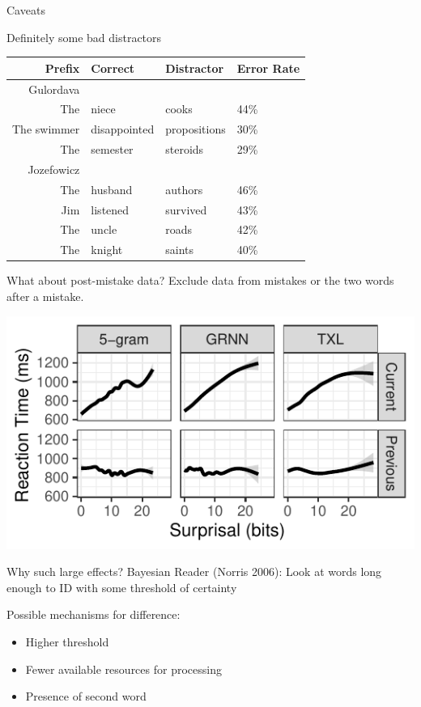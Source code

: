 \documentclass[ 12pt, xcolor=beamer,table,usenames,dvipsnames, ignorenonframetext, ngerman]{beamer}
\begin{document}
\begin{frame}{Caveats}
	
	{\large Definitely some bad distractors}
	\begin{table}
		
		
		\begin{tabular}{rlll}
			Prefix & Correct & Distractor & Error Rate \\
			\hline
			\hline
			Gulordava&&&\\
			\hline
			The & niece & cooks & 44\%\\
			The swimmer & disappointed & propositions & 30\%\\
			The & semester & steroids & 29\%\\
			\hline
			\hline
			Jozefowicz&&&\\
			\hline
			The & husband & authors & 46\%\\
			Jim & listened & survived & 43\%\\
			The & uncle & roads & 42\%\\
			The & knight & saints & 40\%\\
		\end{tabular}
	\end{table}
	
\end{frame}


\begin{frame}{What about post-mistake data?}
	Exclude data from mistakes or the two words after a mistake. 
	
	\includegraphics[width=.9\textwidth]{../Images/gam2.pdf}	
\end{frame}

\begin{frame}{Why such large effects?}
	Bayesian Reader (Norris 2006): Look at words long enough to ID with some threshold of certainty 
	
	
	Possible mechanisms for difference: 
	\begin{itemize}
		\item Higher threshold 
		\item Fewer available resources for processing
		\item Presence of second word 
	\end{itemize}
	
\end{frame}
\end{document}
